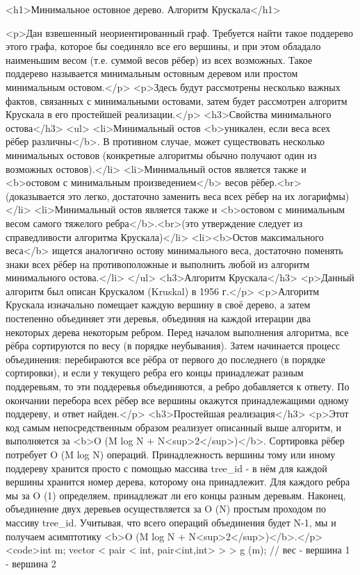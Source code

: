 <h1>Минимальное остовное дерево. Алгоритм Крускала</h1>

<p>Дан взвешенный неориентированный граф. Требуется найти такое поддерево этого графа, которое бы соединяло все его вершины, и при этом обладало наименьшим весом (т.е. суммой весов рёбер) из всех возможных. Такое поддерево называется минимальным остовным деревом или простом минимальным остовом.</p>
<p>Здесь будут рассмотрены несколько важных фактов, связанных с минимальными остовами, затем будет рассмотрен алгоритм Крускала в его простейшей реализации.</p>
<h3>Свойства минимального остова</h3>
<ul>
<li>Минимальный остов <b>уникален, если веса всех рёбер различны</b>. В противном случае, может существовать несколько минимальных остовов (конкретные алгоритмы обычно получают один из возможных остовов).</li>
<li>Минимальный остов является также и <b>остовом с минимальным произведением</b> весов рёбер.<br>(доказывается это легко, достаточно заменить веса всех рёбер на их логарифмы)</li>
<li>Минимальный остов является также и <b>остовом с минимальным весом самого тяжелого ребра</b>.<br>(это утверждение следует из справедливости алгоритма Крускала)</li>
<li><b>Остов максимального веса</b> ищется аналогично остову минимального веса, достаточно поменять знаки всех рёбер на противоположные и выполнить любой из алгоритм минимального остова.</li>
</ul>
<h3>Алгоритм Крускала</h3>
<p>Данный алгоритм был описан Крускалом (Kruskal) в 1956 г.</p>
<p>Алгоритм Крускала изначально помещает каждую вершину в своё дерево, а затем постепенно объединяет эти деревья, объединяя на каждой итерации два некоторых дерева некоторым ребром. Перед началом выполнения алгоритма, все рёбра сортируются по весу (в порядке неубывания). Затем начинается процесс объединения: перебираются все рёбра от первого до последнего (в порядке сортировки), и если у текущего ребра его концы принадлежат разным поддеревьям, то эти поддеревья объединяются, а ребро добавляется к ответу. По окончании перебора всех рёбер все вершины окажутся принадлежащими одному поддереву, и ответ найден.</p>
<h3>Простейшая реализация</h3>
<p>Этот код самым непосредственным образом реализует описанный выше алгоритм, и выполняется за <b>O (M log N + N<sup>2</sup>)</b>. Сортировка рёбер потребует O (M log N) операций. Принадлежность вершины тому или иному поддереву хранится просто с помощью массива tree_id - в нём для каждой вершины хранится номер дерева, которому она принадлежит. Для каждого ребра мы за O (1) определяем, принадлежат ли его концы разным деревьям. Наконец, объединение двух деревьев осуществляется за O (N) простым проходом по массиву tree_id. Учитывая, что всего операций объединения будет N-1, мы и получаем асимптотику <b>O (M log N + N<sup>2</sup>)</b>.</p>
<code>int m;
vector < pair < int, pair<int,int> > > g (m); // вес - вершина 1 - вершина 2

